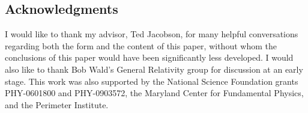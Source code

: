 \documentclass[11pt]{article}
\begin{document}
\small
\subsection*{Acknowledgments}

I would like to thank my advisor, Ted Jacobson, for many helpful conversations regarding both the form and the content of this paper, without whom the conclusions of this paper would have been significantly less developed.  I would also like to thank Bob Wald's General Relativity group for discussion at an early stage.  This work was also supported by the National Science Foundation grants PHY-0601800 and PHY-0903572, the Maryland Center for Fundamental Physics, and the Perimeter Institute.
\normalsize

\begin{thebibliography}{99}


\end{thebibliography}
\end{document}
